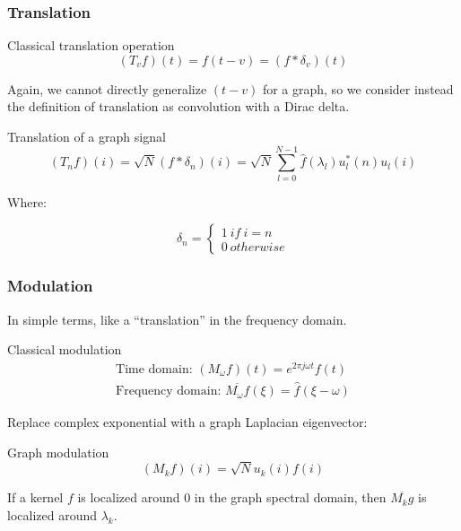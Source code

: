 \documentclass{beamer}
\begin{document}
\begin{frame}
  \frametitle{Translation}

  \begin{block}{Classical translation operation}
    \begin{equation}
      (T_vf)(t) = f(t - v) = (f * \delta_v)(t)
    \end{equation}
  \end{block}  

  Again, we cannot directly generalize $(t - v)$ for a graph, so we consider
  instead the definition of translation as convolution with a Dirac delta. 
  
  \begin{block}{Translation of a graph signal}
    \begin{equation}
     (T_n f)(i) = \sqrt{N} (f * \delta_n)(i) = \sqrt{N} \sum_{l=0}^{N-1} \hat{f}(\lambda_l) u_l^*(n) u_l(i)
    \end{equation}
  \end{block}  

Where:

\begin{equation}
  \delta_n =
  \begin{cases}
    1 \ if \ i=n \\
    0 \ otherwise
  \end{cases}
\end{equation}

\end{frame}

\begin{frame}
  \frametitle{Modulation}

  In simple terms, like a ``translation'' in the frequency domain.
  
  \begin{block}{Classical modulation}
    \begin{equation}
      \begin{split}
        \text{Time domain: } (M_\omega f)(t) = e^{2 \pi j \omega t} f(t) \\
        \text{Frequency domain: } \overline{M_\omega f}(\xi) = \hat{f}(\xi -
        \omega)
      \end{split}
    \end{equation}
  \end{block}  

  Replace complex exponential with a graph Laplacian eigenvector:
  
  \begin{block}{Graph modulation}
    \begin{equation}
      (M_kf)(i) = \sqrt{N} u_k(i) f(i)
    \end{equation}
  \end{block}  

  If a kernel $f$ is localized around 0 in the graph spectral domain, then
  $\overline{M_kg}$ is localized around $\lambda_k$.
\end{frame}
\end{document}
